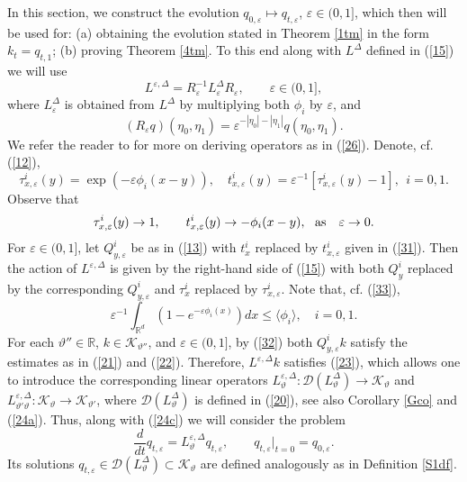 \documentclass[reqno,11pt]{amsart}
\theoremstyle{definition}
\theoremstyle{remark}
\numberwithin{equation}{section}
\begin{document}
 In this section, we construct the evolution $q_{0,
\varepsilon} \mapsto q_{t, \varepsilon}$, $\varepsilon \in (0, 1]$,
which then will be used for: (a) obtaining the evolution stated in
Theorem \ref{1tm} in the form $k_t = q_{t,1}$; (b) proving Theorem
\ref{4tm}. To this end along with $L^\Delta$ defined in (\ref{15})
we will use
\begin{equation}
  \label{26}
  L^{\varepsilon,\Delta} = R^{-1}_\varepsilon  L^\Delta_{\varepsilon}
  R_\varepsilon, \qquad \varepsilon \in (0,1],
\end{equation}
where $L^\Delta_\varepsilon$ is obtained from $L^\Delta$ by
multiplying both $\phi_i$ by $\varepsilon$, and
\[
(R_\varepsilon q)(\eta_0, \eta_1) = \varepsilon^{-|\eta_0| -
|\eta_1|} q(\eta_0, \eta_1).
\]
We refer the reader to \cite{BKKK,FKKO} for more on deriving
operators as in (\ref{26}). Denote, cf. (\ref{12}),
\begin{equation}
  \label{31}
 \tau_{x,\varepsilon}^i (y) = \exp\left( -\varepsilon \phi_i (x-y)\right), \quad  t_{x,\varepsilon}^i
 (y) = \varepsilon^{-1} \left[\tau_{x,\varepsilon}^i (y) -1\right], \ \ i=0,1.
\end{equation}
Observe that
\begin{equation}
  \label{31a}
 \tau_{x,\varepsilon}^i (y) \to 1, \qquad t_{x,\varepsilon}^i
 (y) \to - \phi_i(x-y), \ \ {\rm as} \quad   \varepsilon \to 0.
\end{equation}
For $\varepsilon \in (0,1]$, let $Q^i_{y,\varepsilon}$ be as in
(\ref{13}) with $t_{x}^i$ replaced by $t_{x,\varepsilon}^i$ given in
(\ref{31}). Then the action of $L^{\varepsilon,\Delta}$ is  given by
the right-hand side of (\ref{15}) with both $Q^i_{y}$ replaced by
the corresponding $Q^i_{y,\varepsilon}$ and $\tau_{x}^i$ replaced by
$\tau_{x,\varepsilon}^i$. Note that, cf. (\ref{33}),
\begin{equation}
  \label{32}
\varepsilon^{-1}  \int_{\mathds{R}^d} \left( 1 - e^{-\varepsilon
\phi_i(x)}\right) d x \leq \langle \phi_i \rangle, \quad i=0,1.
\end{equation}
For each $\vartheta''\in \mathds{R}$, $k\in
\mathcal{K}_{\vartheta''}$, and $\varepsilon \in (0,1]$, by
(\ref{32}) both $Q^i_{y,\varepsilon}k$ satisfy the estimates as in
(\ref{21}) and (\ref{22}). Therefore, $L^{\varepsilon,\Delta} k$
satisfies (\ref{23}), which allows one to introduce the
corresponding linear operators $L^{\varepsilon,\Delta}_\vartheta :
\mathcal{D}(L^\Delta_\vartheta) \to \mathcal{K}_\vartheta$ and
$L^{\varepsilon,\Delta}_{\vartheta'\vartheta} :
\mathcal{K}_\vartheta \to \mathcal{K}_{\vartheta'}$, where
$\mathcal{D}(L^\Delta_\vartheta)$ is defined in (\ref{20}), see also
Corollary \ref{Gco} and (\ref{24a}). Thus, along with (\ref{24c}) we
will consider the problem
\begin{equation}
  \label{32a}
 \frac{d}{dt} q_{t,\varepsilon} = L^{\varepsilon,\Delta}_\vartheta
 q_{t,\varepsilon} , \qquad q_{t,\varepsilon}|_{t=0} =
 q_{0,\varepsilon}.
\end{equation}
Its solutions $q_{t,\varepsilon}\in
\mathcal{D}(L^\Delta_\vartheta)\subset \mathcal{K}_{\vartheta}$ are
defined analogously as in Definition \ref{S1df}.
\end{document}

